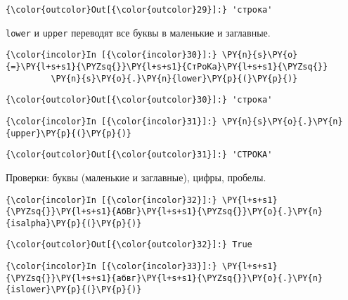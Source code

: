             \begin{Verbatim}[commandchars=\\\{\}]
{\color{outcolor}Out[{\color{outcolor}29}]:} 'строка'
\end{Verbatim}
        
    \texttt{lower} и \texttt{upper} переводят все буквы в маленькие и
заглавные.

    \begin{Verbatim}[commandchars=\\\{\}]
{\color{incolor}In [{\color{incolor}30}]:} \PY{n}{s}\PY{o}{=}\PY{l+s+s1}{\PYZsq{}}\PY{l+s+s1}{СтРоКа}\PY{l+s+s1}{\PYZsq{}}
         \PY{n}{s}\PY{o}{.}\PY{n}{lower}\PY{p}{(}\PY{p}{)}
\end{Verbatim}

            \begin{Verbatim}[commandchars=\\\{\}]
{\color{outcolor}Out[{\color{outcolor}30}]:} 'строка'
\end{Verbatim}
        
    \begin{Verbatim}[commandchars=\\\{\}]
{\color{incolor}In [{\color{incolor}31}]:} \PY{n}{s}\PY{o}{.}\PY{n}{upper}\PY{p}{(}\PY{p}{)}
\end{Verbatim}

            \begin{Verbatim}[commandchars=\\\{\}]
{\color{outcolor}Out[{\color{outcolor}31}]:} 'СТРОКА'
\end{Verbatim}
        
    Проверки: буквы (маленькие и заглавные), цифры, пробелы.

    \begin{Verbatim}[commandchars=\\\{\}]
{\color{incolor}In [{\color{incolor}32}]:} \PY{l+s+s1}{\PYZsq{}}\PY{l+s+s1}{АбВг}\PY{l+s+s1}{\PYZsq{}}\PY{o}{.}\PY{n}{isalpha}\PY{p}{(}\PY{p}{)}
\end{Verbatim}

            \begin{Verbatim}[commandchars=\\\{\}]
{\color{outcolor}Out[{\color{outcolor}32}]:} True
\end{Verbatim}
        
    \begin{Verbatim}[commandchars=\\\{\}]
{\color{incolor}In [{\color{incolor}33}]:} \PY{l+s+s1}{\PYZsq{}}\PY{l+s+s1}{абвг}\PY{l+s+s1}{\PYZsq{}}\PY{o}{.}\PY{n}{islower}\PY{p}{(}\PY{p}{)}
\end{Verbatim}

